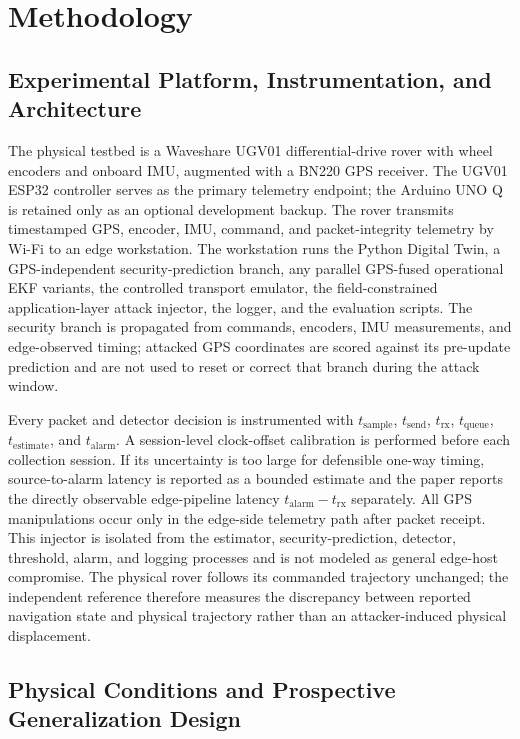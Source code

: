 \documentclass[11pt,a4paper]{article}
\begin{document}
\section{Methodology}

\subsection{Experimental Platform, Instrumentation, and Architecture}
The physical testbed is a Waveshare UGV01 differential-drive rover with wheel encoders and onboard IMU, augmented with a BN220 GPS receiver. The UGV01 ESP32 controller serves as the primary telemetry endpoint; the Arduino UNO Q is retained only as an optional development backup. The rover transmits timestamped GPS, encoder, IMU, command, and packet-integrity telemetry by Wi-Fi to an edge workstation. The workstation runs the Python Digital Twin, a GPS-independent security-prediction branch, any parallel GPS-fused operational EKF variants, the controlled transport emulator, the field-constrained application-layer attack injector, the logger, and the evaluation scripts. The security branch is propagated from commands, encoders, IMU measurements, and edge-observed timing; attacked GPS coordinates are scored against its pre-update prediction and are not used to reset or correct that branch during the attack window.

Every packet and detector decision is instrumented with $t_{\mathrm{sample}}$, $t_{\mathrm{send}}$, $t_{\mathrm{rx}}$, $t_{\mathrm{queue}}$, $t_{\mathrm{estimate}}$, and $t_{\mathrm{alarm}}$. A session-level clock-offset calibration is performed before each collection session. If its uncertainty is too large for defensible one-way timing, source-to-alarm latency is reported as a bounded estimate and the paper reports the directly observable edge-pipeline latency $t_{\mathrm{alarm}}-t_{\mathrm{rx}}$ separately. All GPS manipulations occur only in the edge-side telemetry path after packet receipt. This injector is isolated from the estimator, security-prediction, detector, threshold, alarm, and logging processes and is not modeled as general edge-host compromise. The physical rover follows its commanded trajectory unchanged; the independent reference therefore measures the discrepancy between reported navigation state and physical trajectory rather than an attacker-induced physical displacement.

\subsection{Physical Conditions and Prospective Generalization Design}
\end{document}

